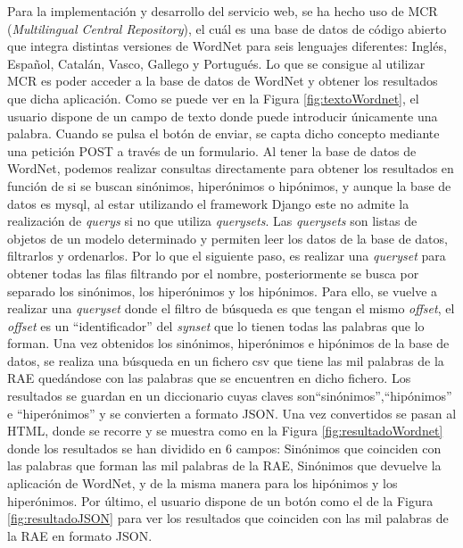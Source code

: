 Para la implementación y desarrollo del servicio web, se ha hecho uso de MCR (\textit{Multilingual Central Repository}), el cuál es una base de datos de código abierto que integra distintas versiones de WordNet para seis lenguajes diferentes: Inglés, Español, Catalán, Vasco, Gallego y Portugués. 
Lo que se consigue al utilizar MCR es poder acceder a la base de datos de WordNet y obtener los resultados que dicha aplicación.
Como se puede ver en la Figura \ref{fig:textoWordnet}, el usuario dispone de un campo de texto donde puede introducir únicamente una palabra. Cuando se pulsa el botón de enviar, se capta dicho concepto mediante una petición POST a través de un formulario.
Al tener la base de datos de WordNet, podemos realizar consultas directamente para obtener los resultados en función de si se buscan sinónimos, hiperónimos o hipónimos, y aunque la base de datos es mysql, al estar utilizando el framework Django este no admite la realización de \textit{querys} si no que utiliza \textit{querysets}.  Las \textit{querysets} son listas de objetos de un modelo determinado y permiten leer los datos de la base de datos, filtrarlos y ordenarlos.
Por lo que el siguiente paso, es realizar una \textit{queryset} para obtener todas las filas filtrando por el nombre, posteriormente se busca por separado los sinónimos, los hiperónimos y los hipónimos. Para ello, se vuelve a realizar una \textit{queryset} donde el filtro de búsqueda es que tengan el mismo \textit{offset}, el \textit{offset} es un ``identificador'' del \textit{synset} que lo tienen todas las palabras que lo forman.
Una vez obtenidos los sinónimos, hiperónimos e hipónimos de la base de datos, se realiza una búsqueda en un fichero csv que tiene las mil palabras de la RAE quedándose con las palabras que se encuentren en dicho fichero.
Los resultados se guardan en un diccionario cuyas claves son``sinónimos'',``hipónimos'' e ``hiperónimos'' y se convierten a formato JSON. Una vez convertidos se pasan al HTML, donde se recorre y se muestra como en la Figura \ref{fig:resultadoWordnet} donde los resultados se han dividido en 6 campos: Sinónimos que coinciden con las palabras que forman las mil palabras de la RAE, Sinónimos que devuelve la aplicación de WordNet, y de la misma manera para los hipónimos y los hiperónimos.
Por último, el usuario dispone de un botón como el de la Figura \ref{fig:resultadoJSON} para ver los resultados que coinciden con las mil palabras de la RAE en formato JSON.


